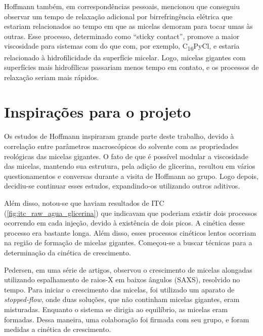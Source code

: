 		
		Hoffmann também, em correspondências pessoais, mencionou que conseguiu observar um tempo de relaxação adicional por birrefringência elétrica\cite{Hoffmann1990} que estariam relacionados ao tempo em que as micelas demoram para tocar umas às outras. Esse processo, determinado como ``sticky contact''\cite{Hoffmann2010, Hoffmann2012a, Yamashita2006}, promove a maior viscosidade para sistemas com \CTAB{} do que com, por exemplo, C\textsubscript{16}PyCl, e estaria relacionado à hidrofilicidade da superfície micelar. Logo, micelas gigantes com superfícies mais hidrofílicas passariam menos tempo em contato, e os processos de relaxação seriam mais rápidos. 
		


		\chapter{Inspirações para o projeto} 

		Os estudos de Hoffmann inspiraram grande parte deste trabalho, devido à correlação entre parâmetros macroscópicos do solvente com as propriedades reológicas das micelas gigantes. O fato de que é possível modular a viscosidade das micelas, mantendo sua estrutura, pela adição de glicerina, resultou em vários questionamentos e conversas durante a visita de Hoffmann ao grupo. Logo depois, decidiu-se continuar esses estudos, expandindo-os utilizando outros aditivos.
		
		Além disso, notou-se que haviam resultados de ITC (\autoref{fig:itc_raw_agua_glicerina}) que indicavam que poderiam existir dois processos ocorrendo em cada injeção, devido à existência de dois picos. A cinética desse processo era bastante longa. Além disso, esses processos cinéticos lentos ocorriam na região de formação de micelas gigantes. Começou-se a buscar técnicas para a determinação da cinética de crescimento.
		
		Pedersen, em uma série de artigos\cite{Jensen2013a, Jensen2014a, Jensen2016a}, observou o crescimento de micelas alongadas utilizando espalhamento de raios-X em baixos ângulos (SAXS), resolvido no tempo. Para iniciar o crescimento das micelas, foi utilizado um aparato de \emph{stopped-flow}, onde duas soluções, que não continham micelas gigantes, eram misturadas. Enquanto o sistema se dirigia ao equilíbrio, as micelas eram formadas. Dessa maneira, uma colaboração foi firmada com seu grupo, e foram medidas a cinética de crescimento.  
		
